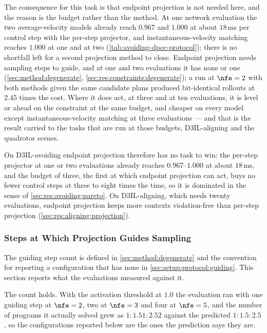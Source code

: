 The consequence for this task is that endpoint projection is not needed here, and the reason is the budget
rather than the method. At one network evaluation the two average-velocity models already reach $0.967$
and $1.000$ at about $18$\,ms per control step with the per-step projector, and instantaneous-velocity
matching reaches $1.000$ at one and at two (\autoref{tab:avoiding-dpcc-protocol}); there is no shortfall
left for a second projection method to close. Endpoint projection needs sampling steps to guide, and at
one and two evaluations it has none or one (\autoref{sec:method:degenerate},
\autoref{sec:res:constraints:degenerate}); a run at $\nfe=2$ with both methods given the same candidate
plans produced bit-identical rollouts at $2.45$ times the cost. Where it does act, at three and at ten
evaluations, it is level or ahead on the constraint at the same budget, and cheaper on every model except
instantaneous-velocity matching at three evaluations --- and that is the result carried to the tasks that are
run at those budgets, D3IL-aligning and the quadrotor scenes.

On D3IL-avoiding endpoint projection therefore has no task to win: the per-step projector at one or two
evaluations already reaches $0.967$--$1.000$ at about $18$\,ms, and the budget of three, the first at which
endpoint projection can act, buys no fewer control steps at three to eight times the time, so it is
dominated in the sense of \autoref{sec:res:avoiding:pareto}. On D3IL-aligning, which needs twenty
evaluations, endpoint projection keeps more contexts violation-free than per-step projection
(\autoref{sec:res:aligning:projection}).

\subsubsection{Steps at Which Projection Guides Sampling}\label{sec:res:constraints:degenerate}

The guiding step count is defined in \autoref{sec:method:degenerate} and the convention for reporting a
configuration that has none in \autoref{sec:setup:protocol:guiding}. This section reports what the
evaluations measured against it.

The count holds. With the activation threshold at $1.0$ the evaluation ran with one guiding step at
$\nfe=2$, two at $\nfe=3$ and four at $\nfe=5$, and the number of programs it actually solved grew as
$1:1.51:2.52$ against the predicted $1:1.5:2.5$, so the configurations reported below are the ones the
prediction says they are.


